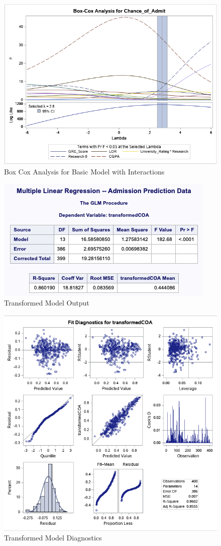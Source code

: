 \documentclass{article}
\begin{document}
\begin{figure}
\centering
\includegraphics[scale=0.5]{box_cox_analysis.png}
\caption{Box Cox Analysis for Basic Model with Interactions}
\label{fig:boxcoxanalysis}
\end{figure}

\begin{figure}
\centering
\includegraphics[scale=1]{transformed_model_output.png}
\caption{Transformed Model Output}
\label{fig:transformedmodeloutput}
\end{figure}

\begin{figure}
\centering
\includegraphics[scale=0.7]{transformed_model_diagnostics.png}
\caption{Transformed Model Diagnostics}
\label{fig:transformedmodeldiagnostics}
\end{figure}
\end{document}
